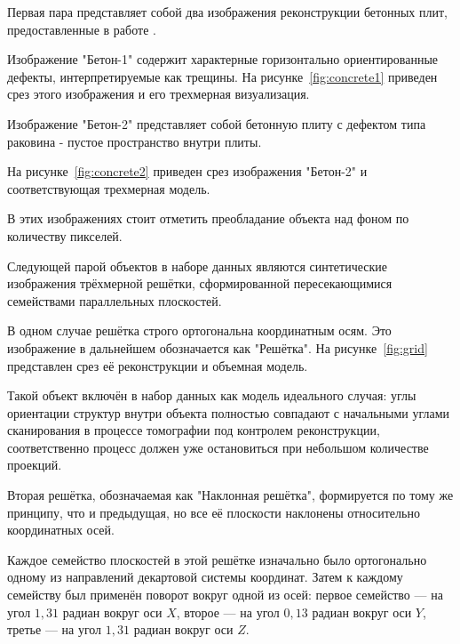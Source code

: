 Первая пара представляет собой два изображения реконструкции бетонных плит, предоставленные в работе \cite{wagner2023comparative}.

Изображение "Бетон-1" содержит характерные горизонтально ориентированные дефекты, интерпретируемые как трещины. На рисунке~\ref{fig:concrete1} приведен срез этого изображения и его трехмерная визуализация.


Изображение "Бетон-2" представляет собой бетонную плиту с дефектом типа раковина - пустое пространство внутри плиты.

На рисунке~\ref{fig:concrete2} приведен срез изображения  "Бетон-2" и соответствующая трехмерная модель.



В этих изображениях стоит отметить преобладание объекта над фоном по количеству пикселей.

Следующей парой объектов в наборе данных являются синтетические изображения трёхмерной решётки, сформированной пересекающимися семействами параллельных плоскостей. 

В одном случае решётка строго ортогональна координатным осям. Это изображение в дальнейшем обозначается как "Решётка". На рисунке~\ref{fig:grid} представлен срез её реконструкции и объемная модель.

Такой объект включён в набор данных как модель идеального случая: углы ориентации структур внутри объекта полностью совпадают с начальными углами сканирования в процессе томографии под контролем реконструкции, соответственно процесс должен уже остановиться при небольшом количестве проекций.


Вторая решётка, обозначаемая как "Наклонная решётка", формируется по тому же принципу, что и предыдущая, но все её плоскости наклонены относительно координатных осей.

Каждое семейство плоскостей в этой решётке изначально было ортогонально одному из направлений декартовой системы координат. Затем к каждому семейству был применён поворот вокруг одной из осей: первое семейство — на угол \(1{,}31\) радиан вокруг оси \(X\), второе — на угол \(0{,}13\) радиан вокруг оси \(Y\), третье — на угол \(1{,}31\) радиан вокруг оси \(Z\).

